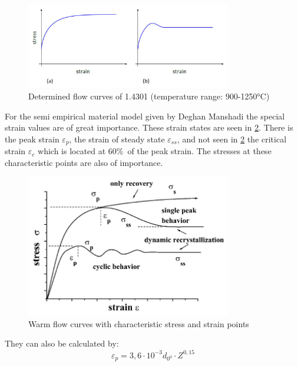 \begin{figure}[htbp]
 \centering
 \includegraphics[width=0.8\textwidth]{images/flowcurves}
 \caption{Determined flow curves of 1.4301 (temperature range: 900-1250°C)}
 \label{img:flowcurves}
\end{figure}

For the semi empirical material model given by Deghan Manshadi \cite{DEG08} the special strain values are of great importance. These strain states are seen in \ref{img:stressstrainpoints}. There is the peak strain $\varepsilon_{p}$, the strain of steady state $\varepsilon_{ss}$, and not seen in \ref{img:stressstrainpoints} the critical strain $\varepsilon_{c}$ which is located at 60\%\ of the peak strain. The stresses at these characteristic points are also of importance.

\begin{figure}[htbp]
 \centering
 \includegraphics[width=0.8\textwidth]{images/stressstrainpoints}
 \caption{Warm flow curves with characteristic stress and strain points \cite{ELW03}}
 \label{img:stressstrainpoints}
\end{figure}

They can also be calculated by:
\begin{equation}
 \varepsilon_{p} = 3,6\cdot10^{-3}d_{0^{0}}\cdot Z^{0,15}
\end{equation}

